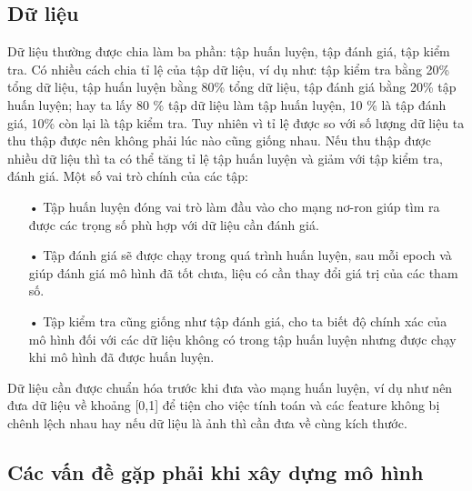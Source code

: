 \subsection{Dữ liệu}
Dữ liệu thường được chia làm ba phần: tập huấn luyện, tập đánh giá, tập kiểm tra. Có nhiều cách chia tỉ lệ của tập dữ liệu, ví dụ như: tập kiểm tra bằng 20\% tổng dữ liệu, tập huấn luyện bằng 80\% tổng dữ liệu, tập đánh giá bằng 20\% tập huấn luyện; hay ta lấy 80 \% tập dữ liệu làm tập huấn luyện, 10 \% là tập đánh giá, 10\% còn lại là tập kiểm tra. Tuy nhiên vì tỉ lệ được so với số lượng dữ liệu ta thu thập được nên không phải lúc nào cũng giống nhau. Nếu thu thập được nhiều dữ liệu thì ta có thể tăng tỉ lệ tập huấn luyện và giảm với tập kiểm tra, đánh giá. Một số vai trò chính của các tập:
\begin{itemize}
\item[•]Tập huấn luyện đóng vai trò làm đầu vào cho mạng nơ-ron giúp tìm ra được các trọng số phù hợp với dữ liệu cần đánh giá.
\item[•]Tập đánh giá sẽ được chạy trong quá trình huấn luyện, sau mỗi epoch và giúp đánh giá mô hình đã tốt chưa, liệu có cần thay đổi giá trị của các tham số.
\item[•]Tập kiểm tra cũng giống như tập đánh giá, cho ta biết độ chính xác của mô hình đối với các dữ liệu không có trong tập huấn luyện nhưng được chạy khi mô hình đã được huấn luyện.
\end{itemize}
Dữ liệu cần được chuẩn hóa trước khi đưa vào mạng huấn luyện, ví dụ như nên đưa dữ liệu về khoảng [0,1] để tiện cho việc tính toán và các feature không bị chênh lệch nhau hay nếu dữ liệu là ảnh thì cần đưa về cùng kích thước.

\subsection{Các vấn đề gặp phải khi xây dựng mô hình}

